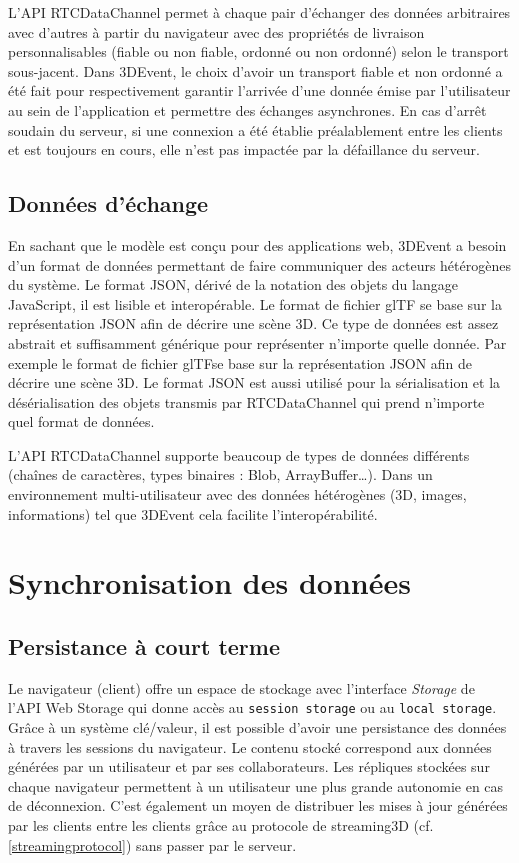 L'API RTCDataChannel permet à chaque pair d'échanger des données arbitraires 
avec d'autres à partir du navigateur avec des propriétés de livraison 
personnalisables (fiable ou non fiable, ordonné ou non ordonné) selon le transport 
sous-jacent. Dans 3DEvent, le choix d'avoir un transport fiable 
et non ordonné a été fait pour respectivement 
garantir l'arrivée d'une donnée émise par l'utilisateur au sein de l'application et 
permettre des échanges asynchrones.
En cas d'arrêt soudain du serveur, si une connexion a été établie préalablement 
entre les clients et est toujours en cours, elle n'est pas impactée par la défaillance 
du serveur.
\subsection{Données d'échange}
En sachant que le modèle est conçu pour des applications web, 3DEvent a besoin 
d'un format de données permettant de faire communiquer des acteurs hétérogènes 
du système. Le format \gls{JSON}, dérivé de la notation des objets du langage 
JavaScript, il est lisible et interopérable. 
Le format de fichier \gls{glTF} se base sur la représentation \gls{JSON} afin de 
décrire une scène 3D.
Ce type de données est assez abstrait et suffisamment générique pour 
représenter n'importe quelle donnée. Par exemple le format de fichier 
\gls{glTF}se base sur la représentation \gls{JSON} afin de 
décrire une scène 3D.
Le format \gls{JSON} est aussi utilisé pour la sérialisation et la désérialisation des 
objets transmis par RTCDataChannel qui prend n'importe quel format de données.

L'\acrshort{API} RTCDataChannel supporte beaucoup de types de données 
différents (chaînes de caractères, types binaires : Blob, ArrayBuffer\dots). Dans 
un environnement multi-utilisateur avec des données hétérogènes (3D, images, 
informations) tel que 3DEvent cela facilite l'interopérabilité.


\section{Synchronisation des données}
\subsection{Persistance à court terme}
Le navigateur (client) offre un espace de stockage avec l'interface \textit{Storage} 
de l'API Web Storage qui donne accès au \texttt{session storage} ou au  
\texttt{local storage}. Grâce à un système clé/valeur, il est possible d'avoir une 
persistance des données à travers les sessions du navigateur. Le contenu stocké 
correspond aux données générées par un utilisateur et par ses collaborateurs. Les 
répliques stockées sur chaque navigateur permettent à un utilisateur une plus 
grande 
autonomie en cas de déconnexion. C'est également un moyen de distribuer les 
mises à jour générées par les clients entre les clients grâce au protocole de 
\gls{streaming3D} (cf. \ref{streamingprotocol}) sans passer par le serveur.

